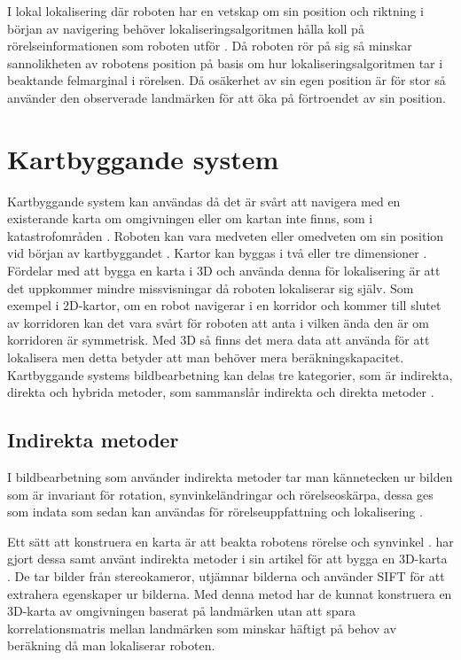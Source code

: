 I lokal lokalisering där roboten har en vetskap om sin position och riktning i början av navigering behöver lokaliseringsalgoritmen hålla koll på rörelseinformationen som roboten utför \citep{montecarlo,ProbabilisticRobotics}. Då roboten rör på sig så minskar sannolikheten av robotens position på basis om hur lokaliseringsalgoritmen tar i beaktande felmarginal i rörelsen. Då osäkerhet av sin egen position är för stor så använder den observerade landmärken för att öka på förtroendet av sin position. 

\section{Kartbyggande system}

Kartbyggande system kan användas då det är svårt att navigera med en existerande karta om omgivningen eller om kartan inte finns, som i katastrofområden \citep{geospatial}. Roboten kan vara medveten eller omedveten om sin position vid början av kartbyggandet \citep{globalsubmaps}. Kartor kan byggas i två eller tre dimensioner \citep{ProbabilisticRobotics}. Fördelar med att bygga en karta i 3D och använda denna för lokalisering är att det uppkommer mindre missvisningar då roboten lokaliserar sig själv. Som exempel i 2D-kartor, om en robot navigerar i en korridor och kommer till slutet av korridoren kan det vara svårt för roboten att anta i vilken ända den är om korridoren är symmetrisk. Med 3D så finns det mera data att använda för att lokalisera men detta betyder att man behöver mera beräkningskapacitet. Kartbyggande systems bildbearbetning kan delas tre kategorier, som är indirekta, direkta och hybrida metoder, som sammanslår indirekta och direkta metoder \citep{geospatial}.

\subsection{Indirekta metoder}

I bildbearbetning som använder indirekta metoder tar man kännetecken ur bilden som är invariant för rotation, synvinkeländringar och rörelseoskärpa, dessa ges som indata som sedan kan användas för rörelseuppfattning och lokalisering \citep{geospatial}. 

Ett sätt att konstruera en karta är att beakta robotens rörelse och synvinkel \citep{globalsubmaps}. \cite{mapbuildingsift} har gjort dessa samt använt indirekta metoder i sin artikel  för att bygga en 3D-karta \citep{mapbuildingsift}. De tar bilder från stereokameror, utjämnar bilderna och använder SIFT för att extrahera egenskaper ur bilderna. Med denna metod har de kunnat konstruera en 3D-karta av omgivningen baserat på landmärken utan att spara korrelationsmatris mellan landmärken som minskar häftigt på behov av beräkning då man lokaliserar roboten. 

